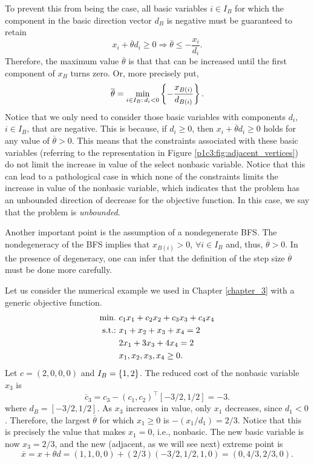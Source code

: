 To prevent this from being the case, all basic variables $i \in I_B$ for which the component in the basic direction vector $d_B$ is negative must be guaranteed to retain
%
\begin{equation*}
	x_i + \overline{\theta}d_i \geq 0 \Rightarrow \overline{\theta} \leq -\frac{x_i}{d_i}.
\end{equation*}
%
Therefore, the maximum value $\overline{\theta}$ is that that can be increased until the first component of $x_B$ turns zero. Or, more precisely put, 
%
\begin{equation*}
	\overline{\theta} = \min_{i \in I_B : \, d_i < 0} \left\{ -\frac{x_{B(i)}}{d_{B(i)}} \right \}.
\end{equation*}
%
Notice that we only need to consider those basic variables with components $d_i$, $i \in I_B$, that are negative. This is because, if $d_i \ge 0$, then $x_i + \overline{\theta}d_i \geq 0$ holds for any value of $\overline{\theta} > 0$. This means that the constraints associated with these basic variables (referring to the representation in Figure \ref{p1c3:fig:adjacent_vertices}) do not limit the increase in value of the select nonbasic variable. Notice that this can lead to a pathological case in which none of the constraints limits the increase in value of the nonbasic variable, which indicates that the problem has an unbounded direction of decrease for the objective function. In this case, we say that the problem is \emph{unbounded}.

Another important point is the assumption of a nondegenerate BFS. The nondegeneracy of the BFS implies that  $x_{B(i)} > 0$, $\forall i \in I_B$ and, thus, $\overline{\theta} > 0$. In the presence of degeneracy, one can infer that the definition of the step size $\overline{\theta}$ must be done more carefully.

Let us consider the numerical example we used in Chapter \ref{chapter_3} with a generic objective function. 
%
\begin{align*}
	\mathop{\text{min.~}} & c_1x_1 + c_2x_2 + c_3x_3 + c_4x_4 \\	
	\mathop{\text{s.t.:~}} & x_1 + x_2 + x_3 + x_4 = 2 \\
	& 2x_1 + 3x_3 + 4x_4 = 2 \\
	& x_1, x_2 ,x_3, x_4 \geq 0.  
\end{align*}
%
Let $c = (2,0,0,0)$ and $I_B=\left\{ 1,2 \right \} $. The reduced cost of the nonbasic variable $x_3$ is 
%
\begin{equation*}
	\overline{c}_3 = c_3 - (c_1, c_2)^\top [-3/2, 1/2] = -3.	
\end{equation*}
%
where $d_B = [-3/2, 1/2]$. As $x_3$ increases in value, only $x_1$ decreases, since $d_1 < 0$. Therefore, the largest $\overline{\theta}$ for which $x_1\geq 0$ is $-(x_1/d_1)= 2/3$. Notice that this is precisely the value that makes $x_1 = 0$, i.e., nonbasic. The new basic variable is now $x_3 = 2/3$, and the new (adjacent, as we will see next) extreme point is 
%
\begin{equation*}
	\overline{x} = x + \theta d = (1,1,0,0) + (2/3)(-3/2, 1/2, 1, 0) = (0,4/3,2/3,0).	
\end{equation*}



